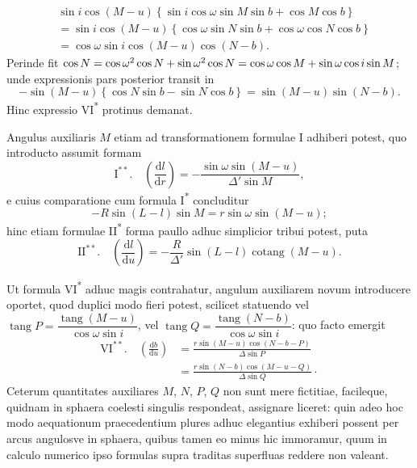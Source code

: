 \[
\begin{aligned}
&\sin i\cos(M-u)\left\{\sin i\cos\omega\sin M\sin b + \cos M\cos b\right\}\\
&= \sin i\cos(M-u)\left\{\cos\omega\sin N\sin b + \cos\omega\cos N\cos b\right\}\\
&= \cos\omega\sin i\cos(M-u)\cos(N-b).
\end{aligned}
\]
\noindent Perinde fit $\cos N =\allowbreak \cos\omega^2\cos N +\allowbreak \sin\omega^2\cos N =\hfil\penalty-10000 \cos\omega\cos M +\allowbreak \sin\omega\cos i\sin M$; unde expressionis pars posterior transit in
\[
-\sin(M-u)\left\{\cos N\sin b - \sin N\cos b\right\} = \sin(M-u)\sin(N-b).
\]
\noindent Hinc expressio VI\textsuperscript{*} protinus demanat.

Angulus auxiliaris $M$ etiam ad transformationem formulae I adhiberi potest, quo introducto assumit formam
\[
\mathrm{I}^{**}.\quad \left(\frac{\mathrm{d}l}{\mathrm{d}r}\right) = -\frac{\sin\omega\sin(M-u)}{\Delta'\sin M},
\]
\noindent e cuius comparatione cum formula I\textsuperscript{*} concluditur
\[
-R\sin(L-l)\sin M = r\sin\omega\sin(M-u);
\]
\noindent hinc etiam formulae II\textsuperscript{*} forma paullo adhuc simplicior tribui potest, puta
\[
\mathrm{II}^{**}.\quad \left(\frac{\mathrm{d}l}{\mathrm{d}u}\right) = -\frac{R}{\Delta'}\sin(L-l)\operatorname{cotang}(M-u).
\]

Ut formula VI\textsuperscript{*} adhuc magis contrahatur, angulum auxiliarem novum introducere oportet, quod duplici modo fieri potest, scilicet statuendo vel $\operatorname{tang}P=\dfrac{\operatorname{tang}(M-u)}{\cos\omega\sin i}$, vel $\operatorname{tang}Q=\dfrac{\operatorname{tang}(N-b)}{\cos\omega\sin i}$: quo facto emergit
\[
\begin{aligned}
\mathrm{VI}^{**}.\quad \left(\frac{\mathrm{d}b}{\mathrm{d}u}\right) &= \frac{r\sin(M-u)\cos(N-b-P)}{\Delta\sin P}\\
& = \frac{r\sin(N-b)\cos(M-u-Q)}{\Delta\sin Q}\mathpunct{\cdot}
\end{aligned}
\]
\noindent Ceterum quantitates auxiliares $M$, $N$, $P$, $Q$ non sunt mere fictitiae, facileque, quidnam in sphaera coelesti singulis respondeat, assignare liceret: quin adeo hoc modo aequationum praecedentium plures adhuc elegantius exhiberi possent per arcus angulosve in sphaera, quibus tamen eo minus hic immoramur, quum in calculo numerico ipso formulas supra traditas superfluas reddere non valeant.

